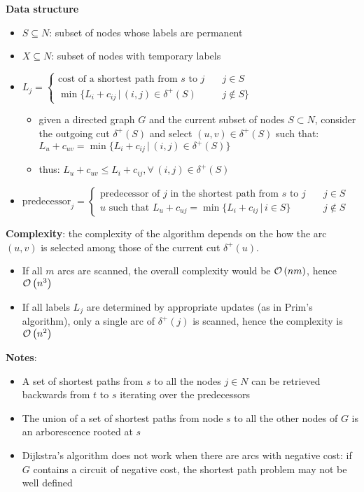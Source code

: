 \documentclass[english]{article}
\begin{document}
\bigskip
\textbf{Data structure}
\begin{itemize}
  \item \(S \subseteq N\): subset of nodes whose labels are permanent
  \item \(X \subseteq N\): subset of nodes with temporary labels
  \item \(L_j = \begin{cases} \text{cost of a shortest path from } s \text{ to } j \quad & j \in S \\ \min\{L_i + c_{ij} \, | \, (i, j) \in \delta^+(S) & j \notin S\}\end{cases}\)
        \begin{itemize}[label=\(\rightarrow\)]
          \item given a directed graph \(G\) and the current subset of nodes \(S \subset N\), consider the outgoing cut \(\delta^+(S)\) and select \((u, v) \in \delta^+(S)\) such that: \( L_u + c_{uv} = \min\{L_i + c_{ij} \, | \, (i, j) \in \delta^+ (S)\}\)
          \item thus: \(L_u + c_{uv} \leq L_i + c_{ij}, \forall \, (i, j) \in \delta^+(S)\)
        \end{itemize}
  \item \(\text{predecessor}_j = \begin{cases}\text{predecessor of } j \text{ in the shortest path from } s \text{ to } j \quad& j \in S \\ u \text{ such that } L_u + c_{uj} = \min\{L_i + c_{ij} \, | \, i \in S\} & j \notin S\end{cases}\)
\end{itemize}

\bigskip
\textbf{Complexity}:
the complexity of the algorithm depends on the how the arc \((u, v)\) is selected among those of the current cut \(\delta^+(u)\).
\begin{itemize}
  \item If all \(m\) arcs are scanned, the overall complexity would be \(\mathcal{O}\left(nm\right)\), hence \(\mathcal{O}\left(n^3\right)\)
  \item If all labels \(L_j\) are determined by appropriate updates (as in Prim's algorithm), only a single arc of \(\delta^+(j)\) is scanned, hence the complexity is \(\mathcal{O}\left(n^2\right)\)
\end{itemize}

\bigskip
\textbf{Notes}:
\begin{itemize}
  \item A set of shortest paths from \(s\) to all the nodes \(j \in N\) can be retrieved backwards from \(t\) to \(s\) iterating over the predecessors
  \item The union of a set of shortest paths from node \(s\) to all the other nodes of \(G\) is an arborescence rooted at \(s\)
  \item Dijkstra's algorithm does not work when there are arcs with negative cost: if \(G\) contains a circuit of negative cost, the shortest path problem may not be well defined
\end{itemize}
\end{document}
